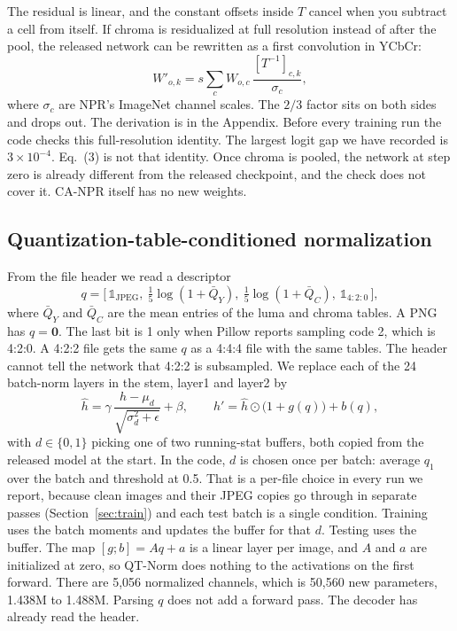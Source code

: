 \documentclass[conference]{IEEEtran}
\begin{document}
The residual is linear, and the constant offsets inside $T$ cancel when you subtract a cell from itself. If chroma is residualized at full resolution instead of after the pool, the released network can be rewritten as a first convolution in YCbCr:
\begin{equation}
W'_{o,k} = s \sum_{c} W_{o,c}\, \frac{[T^{-1}]_{c,k}}{\sigma_c},
\end{equation}
where $\sigma_c$ are NPR's ImageNet channel scales. The $2/3$ factor sits on both sides and drops out. The derivation is in the Appendix. Before every training run the code checks this full-resolution identity. The largest logit gap we have recorded is $3{\times}10^{-4}$. Eq.~(3) is not that identity. Once chroma is pooled, the network at step zero is already different from the released checkpoint, and the check does not cover it. CA-NPR itself has no new weights.

\subsection{Quantization-table-conditioned normalization}
From the file header we read a descriptor
\begin{equation}
q = \big[\,\mathbb{1}_{\text{JPEG}},\ \tfrac{1}{5}\log(1+\bar Q_Y),\ \tfrac{1}{5}\log(1+\bar Q_C),\ \mathbb{1}_{4:2:0}\,\big],
\end{equation}
where $\bar Q_Y$ and $\bar Q_C$ are the mean entries of the luma and chroma tables. A PNG has $q=\mathbf{0}$. The last bit is 1 only when Pillow reports sampling code 2, which is 4:2:0. A 4:2:2 file gets the same $q$ as a 4:4:4 file with the same tables. The header cannot tell the network that 4:2:2 is subsampled. We replace each of the 24 batch-norm layers in the stem, layer1 and layer2 by
\begin{equation}
\hat h = \gamma\,\frac{h-\mu_d}{\sqrt{\sigma^2_d+\epsilon}}+\beta, \qquad
h' = \hat h \odot \big(1+g(q)\big) + b(q),
\end{equation}
with $d\in\{0,1\}$ picking one of two running-stat buffers, both copied from the released model at the start. In the code, $d$ is chosen once per batch: average $q_1$ over the batch and threshold at 0.5. That is a per-file choice in every run we report, because clean images and their JPEG copies go through in separate passes (Section~\ref{sec:train}) and each test batch is a single condition. Training uses the batch moments and updates the buffer for that $d$. Testing uses the buffer. The map $[g;b]=Aq+a$ is a linear layer per image, and $A$ and $a$ are initialized at zero, so QT-Norm does nothing to the activations on the first forward. There are 5{,}056 normalized channels, which is 50{,}560 new parameters, 1.438M to 1.488M. Parsing $q$ does not add a forward pass. The decoder has already read the header.
\end{document}
